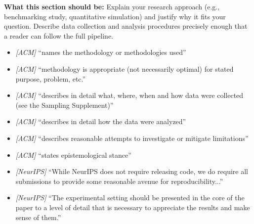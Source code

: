 \noindent\textbf{What this section should be:}
Explain your research approach (e.g., benchmarking study, quantitative simulation) and justify why it fits your question. Describe data collection and analysis procedures precisely enough that a reader can follow the full pipeline.
\begin{itemize}
  \item \textit{[ACM]} ``names the methodology or methodologies used''
  \item \textit{[ACM]} ``methodology is appropriate (not necessarily optimal) for stated purpose, problem, etc.''
  \item \textit{[ACM]} ``describes in detail what, where, when and how data were collected (see the Sampling Supplement)''
  \item \textit{[ACM]} ``describes in detail how the data were analyzed''
  \item \textit{[ACM]} ``describes reasonable attempts to investigate or mitigate limitations''
  \item \textit{[ACM]} ``states epistemological stance''
  \item \textit{[NeurIPS]} ``While NeurIPS does not require releasing code, we do require all submissions to provide some reasonable avenue for reproducibility...''
  \item \textit{[NeurIPS]} ``The experimental setting should be presented in the core of the paper to a level of detail that is necessary to appreciate the results and make sense of them.''
\end{itemize}